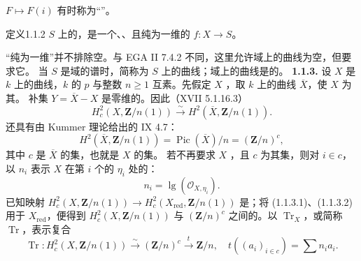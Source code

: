  $F\mapsto F(i)$ 有时称为“”。
\begin{SGAresult}{定义}{1.1.2}
 $S$ 上的，是一个、、且纯为一维的 $f:X\to S$。
\end{SGAresult}
“纯为一维”并不排除空。与 EGA II 7.4.2 不同，这里允许域上的曲线为空，但要求它。
当 $S$ 是域的谱时，简称为 $S$ 上的曲线；域上的曲线是的。
\textbf{1.1.3.} 设 $X$ 是 $k$ 上的曲线，$k$ 的 $p$ 与整数 $n\geq1$ 互素。先假定 $X$ ，取 $k$ 上的曲线 $\overline X$，使 $X$ 为其。
补集 $Y=\overline X-X$ 是零维的。因此（XVII 5.1.16.3）
\begin{equation}H_c^2(X,\mathbf Z/n(1))\xrightarrow\sim H^2(\overline X,\mathbf Z/n(1)).\tag{1.1.3.1}\end{equation}
还具有由 Kummer 理论给出的 IX 4.7：
\begin{equation}H^2(\overline X,\mathbf Z/n(1))=\operatorname{Pic}(\overline X)/n=(\mathbf Z/n)^c,\tag{1.1.3.2}\end{equation}
其中 $c$ 是 $\overline X$ 的集，也就是 $X$ 的集。
若不再要求 $X$ ，且 $c$ 为其集，则对 $i\in c$，以 $n_i$ 表示 $X$ 在第 $i$ 个的 $\eta_i$ 处的：
\[n_i=\operatorname{lg}(\mathscr O_{X,\eta_i}).\]
已知映射 $H_c^2(X,\mathbf Z/n(1))\to H_c^2(X_{\mathrm{red}},\mathbf Z/n(1))$ 是；将 (1.1.3.1)、(1.1.3.2) 用于 $X_{\mathrm{red}}$，便得到 $H_c^2(X,\mathbf Z/n(1))$ 与 $(\mathbf Z/n)^c$ 之间的。以 $\operatorname{Tr}_X$，或简称 $\operatorname{Tr}$，表示复合
\begin{equation}\operatorname{Tr}:H_c^2(X,\mathbf Z/n(1))\xrightarrow\sim(\mathbf Z/n)^c\xrightarrow t\mathbf Z/n,\quad t((a_i)_{i\in c})=\sum n_i a_i.\tag{1.1.3.3}\end{equation}

